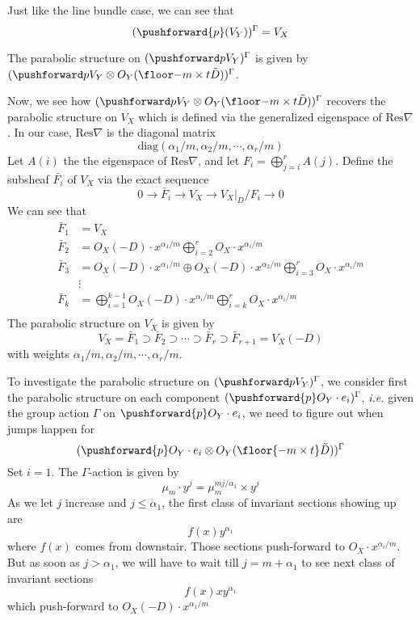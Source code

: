 \documentclass{article}
\begin{document}
Just like the line bundle case, we can see that 
\[
    (\pushforward{p}(V_Y))^{\Gamma} = V_X
\]

The parabolic structure on $\invariant$ is given by $\invariantt$. 

Now, we see how $\invariantt$ recovers the parabolic structure on $V_X$ which is defined via 
the generalized eigenspace of $\text{Res}\nabla$. In our case, $\text{Res}\nabla$ is the 
diagonal matrix
\[
    \text{diag}(\alpha_1/m, \alpha_2/m,\cdots,\alpha_r/m)
\]
Let $A(i)$ the the eigenspace of $\text{Res}\nabla$, and let
$F_i = \bigoplus\limits_{j=i}^{r} A(j)$. Define the subsheaf $\bar{F_i}$ of $V_X$ via the 
exact sequence
\[
    0 \rightarrow \bar{F}_i \rightarrow V_X \rightarrow V_X|_D/F_i \rightarrow 0
\]
We can see that 
\begin{align*}
    \bar{F}_1 & = V_X \\
    \bar{F}_2 & = O_X(-D)\cdot x^{\alpha_1/m}\bigoplus\limits_{i=2}^{r}O_X\cdot x^{\alpha_i/m} \\
    \bar{F}_3 & = O_X(-D)\cdot x^{\alpha_1/m}\oplus O_X(-D)\cdot x^{\alpha_2/m}
        \bigoplus\limits_{i=3}^{r}O_X\cdot x^{\alpha_i/m} \\
              & \vdots \\
    \bar{F}_k & = \bigoplus\limits_{i=1}^{k-1}O_X(-D)\cdot x^{\alpha_i/m}
        \bigoplus\limits_{i=k}^{r}O_X\cdot x^{\alpha_i/m} \\
\end{align*}
The parabolic structure on $V_X$ is given by
\[
    V_X = \bar{F}_1 \supset \bar{F}_2 \supset \cdots \supset \bar{F}_r 
        \supset \bar{F}_{r+1} = V_X(-D) 
\]
with weights $\alpha_1/m, \alpha_2/m,\cdots,\alpha_r/m$.

To investigate the parabolic structure on $\invariant$, we consider first the parabolic
structure on each component $(\pushforward{p}O_Y\cdot e_i)^{\Gamma}$, \emph{i.e.} given the group 
action $\Gamma$ on $\pushforward{p}O_Y\cdot e_i$, we need to figure out when jumps happen for
\[
    (\pushforward{p}O_Y\cdot e_i\otimes O_Y(\floor{-m\times t}\tD))^{\Gamma}
\]
Set $i = 1$. The $\Gamma$-action is given by
\[
    \mu_m\cdot y^j = \mu_m^{mj/\alpha_1}\times y^j
\]
As we let $j$ increase and $j \le \alpha_1$, the first class of invariant sections showing up are
\[
    f(x)y^{\alpha_1}
\]
where $f(x)$ comes from downstair. 
Those sections push-forward to $O_X\cdot x^{\alpha_i/m}$. But as soon as $j > \alpha_1$, 
we will have to wait till $j = m + \alpha_1$ to see next class of invariant sections
\[
    f(x)xy^{\alpha_1}
\]
which push-forward to $O_X(-D)\cdot x^{\alpha_1/m}$ 
\end{document}

